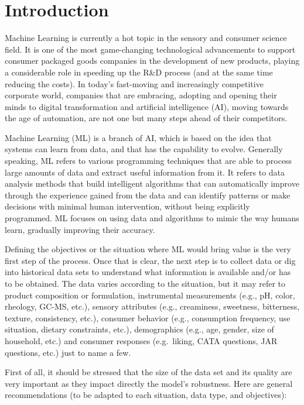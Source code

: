 \documentclass[
]{krantz}
\begin{document}
\hypertarget{introduction-2}{%
\section{Introduction}\label{introduction-2}}

Machine Learning is currently a hot topic in the sensory and consumer science field. It is one of the most game-changing technological advancements to support consumer packaged goods companies in the development of new products, playing a considerable role in speeding up the R\&D process (and at the same time reducing the costs). In today's fast-moving and increasingly competitive corporate world, companies that are embracing, adopting and opening their minds to digital transformation and artificial intelligence (AI), moving towards the age of automation, are not one but many steps ahead of their competitors.

Machine Learning (ML) is a branch of AI, which is based on the idea that systems can learn from data, and that has the capability to evolve. Generally speaking, ML refers to various programming techniques that are able to process large amounts of data and extract useful information from it. It refers to data analysis methods that build intelligent algorithms that can automatically improve through the experience gained from the data and can identify patterns or make decisions with minimal human intervention, without being explicitly programmed. ML focuses on using data and algorithms to mimic the way humans learn, gradually improving their accuracy.

Defining the objectives or the situation where ML would bring value is the very first step of the process. Once that is clear, the next step is to collect data or dig into historical data sets to understand what information is available and/or has to be obtained. The data varies according to the situation, but it may refer to product composition or formulation, instrumental measurements (e.g., pH, color, rheology, GC-MS, etc.), sensory attributes (e.g., creaminess, sweetness, bitterness, texture, consistency, etc.), consumer behavior (e.g., consumption frequency, use situation, dietary constraints, etc.), demographics (e.g., age, gender, size of household, etc.) and consumer responses (e.g.~liking, CATA questions, JAR questions, etc.) just to name a few.

First of all, it should be stressed that the size of the data set and its quality are very important as they impact directly the model's robustness. Here are general recommendations (to be adapted to each situation, data type, and objectives):
\end{document}
